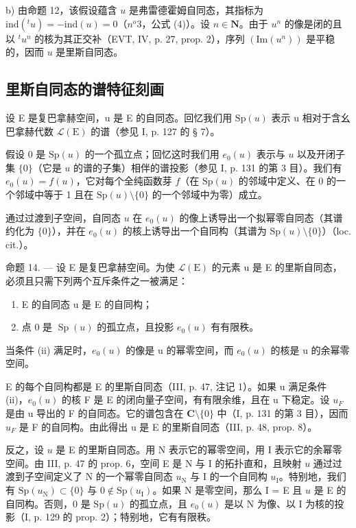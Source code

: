 b) 由命题 12，该假设蕴含 \(u\) 是弗雷德霍姆自同态，其指标为 \(\text{ind}(^t u) = -\text{ind}(u) = 0\)（\(n^o 3\)，公式 (4)）。设 \(n \in \mathbf{N}\)。由于 \(u^n\) 的像是闭的且以 \(^t u^n\) 的核为其正交补（EVT, IV, p. 27, prop. 2），序列 \((\text{Im}(u^n))\) 是平稳的，因而 \(u\) 是里斯自同态。


\subsection{里斯自同态的谱特征刻画}

设 E 是复巴拿赫空间，u 是 E 的自同态。回忆我们用 \(\mathrm{Sp}(u)\) 表示 u 相对于含幺巴拿赫代数 \(\mathcal{L}(\mathrm{E})\) 的谱（参见 I, p. 127 的 § 7）。

假设 0 是 \(\mathrm{Sp}(u)\) 的一个孤立点；回忆这时我们用 \(e_0(u)\) 表示与 \(u\) 以及开闭子集 \(\{0\}\)（它是 \(u\) 的谱的子集）相伴的谱投影（参见 I, p. 131 的第 3 目）。我们有 \(e_0(u) = f(u)\)，它对每个全纯函数芽 \(f\)（在 \(\mathrm{Sp}(u)\) 的邻域中定义、在 0 的一个邻域中等于 1 且在 \(\mathrm{Sp}(u) \setminus \{0\}\) 的一个邻域中为零）成立。

通过过渡到子空间，自同态 \(u\) 在 \(e_0(u)\) 的像上诱导出一个拟幂零自同态（其谱约化为 \(\{0\}\)），并在 \(e_0(u)\) 的核上诱导出一个自同构（其谱为 \(\mathrm{Sp}(u) \setminus \{0\}\)）（loc. cit.）。

命题 14. --- 设 E 是复巴拿赫空间。为使 \(\mathcal{L}(\mathrm{E})\) 的元素 u 是 E 的里斯自同态，必须且只需下列两个互斥条件之一被满足：

\begin{enumerate}
\def\labelenumi{(\roman{enumi})}
\item
  E 的自同态 u 是 E 的自同构；
\item
  点 0 是 \(\operatorname{Sp}(u)\) 的孤立点，且投影 \(e_0(u)\) 有有限秩。
\end{enumerate}

当条件 (ii) 满足时，\(e_{0}(u)\) 的像是 u 的幂零空间，而 \(e_{0}(u)\) 的核是 u 的余幂零空间。

E 的每个自同构都是 E 的里斯自同态（III, p. 47, 注记 1）。如果 u 满足条件 (ii)，\(e_{0}(u)\) 的核 F 是 E 的闭向量子空间，有有限余维，且在 u 下稳定。设 \(u_{F}\) 是由 u 导出的 F 的自同态。它的谱包含在 \(\mathbf{C}\setminus\{0\}\) 中（I, p. 131 的第 3 目），因而 \(u_{F}\) 是 F 的自同构。由此得出 u 是 E 的里斯自同态（III, p. 48, prop. 8）。

反之，设 \(u\) 是 E 的里斯自同态。用 N 表示它的幂零空间，用 I 表示它的余幂零空间。由 III, p. 47 的 prop. 6，空间 E 是 N 与 I 的拓扑直和，且映射 \(u\) 通过过渡到子空间定义了 N 的一个幂零自同态 \(u_{\mathrm{N}}\) 与 I 的一个自同构 \(u_{\mathrm{I}}\)。特别地，我们有 \(\mathrm{Sp}(u_{\mathrm{N}}) \subset \{0\}\) 与 \(0 \not\in \mathrm{Sp}(u_{\mathrm{I}})\)。如果 N 是零空间，那么 I = E 且 \(u\) 是 E 的自同构。否则，0 是 \(\mathrm{Sp}(u)\) 的孤立点，且 \(e_0(u)\) 是以 N 为像、以 I 为核的投影（I, p. 129 的 prop. 2）；特别地，它有有限秩。

